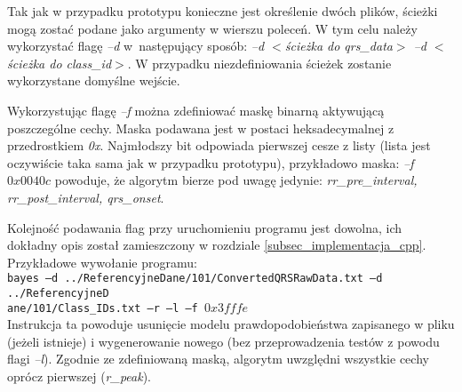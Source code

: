 Tak jak w przypadku prototypu konieczne jest określenie dwóch plików, ścieżki mogą zostać podane jako argumenty w wierszu poleceń. W tym celu należy wykorzystać flagę \textit{--d} w~następujący sposób: \textit{--d $<$ścieżka do qrs\_data$>$ --d $<$ścieżka do class\_id$>$}. W przypadku niezdefiniowania ścieżek zostanie wykorzystane domyślne wejście.

Wykorzystując flagę \textit{--f} można zdefiniować maskę binarną aktywującą poszczególne cechy. Maska podawana jest w postaci heksadecymalnej z przedrostkiem \textit{0x}. Najmłodszy bit odpowiada pierwszej cesze z listy (lista jest oczywiście taka sama jak w przypadku prototypu), przykładowo maska: \textit{--f $0x0040c$} powoduje, że algorytm bierze pod uwagę jedynie: \textit{rr\_pre\_interval, rr\_post\_interval, qrs\_onset}.

Kolejność podawania flag przy uruchomieniu programu jest dowolna, ich dokładny opis został zamieszczony w rozdziale \ref{subsec_implementacja_cpp}. Przykładowe wywołanie programu:\\ 
\texttt{bayes --d ../ReferencyjneDane/101/ConvertedQRSRawData.txt --d ../ReferencyjneD\\ane/101/Class\_IDs.txt --r --l --f $0x3fffe$}\\ 
Instrukcja ta powoduje usunięcie modelu prawdopodobieństwa zapisanego w pliku (jeżeli istnieje) i wygenerowanie nowego (bez przeprowadzenia testów z powodu flagi \textit{--l}). Zgodnie ze zdefiniowaną maską, algorytm uwzględni wszystkie cechy oprócz pierwszej (\textit{r\_peak}). 
